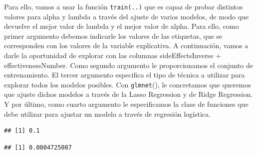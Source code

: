 \documentclass[spanish,]{article}
\newenvironment{Shaded}{\begin{snugshade}}{\end{snugshade}}
\newcommand{\KeywordTok}[1]{\textcolor[rgb]{0.13,0.29,0.53}{\textbf{#1}}}
\newcommand{\DataTypeTok}[1]{\textcolor[rgb]{0.13,0.29,0.53}{#1}}
\newcommand{\StringTok}[1]{\textcolor[rgb]{0.31,0.60,0.02}{#1}}
\newcommand{\CommentTok}[1]{\textcolor[rgb]{0.56,0.35,0.01}{\textit{#1}}}
\newcommand{\OperatorTok}[1]{\textcolor[rgb]{0.81,0.36,0.00}{\textbf{#1}}}
\newcommand{\NormalTok}[1]{#1}
\begin{document}
Para ello, vamos a usar la función \texttt{train(..)} que es capaz de
probar distintos valores para alpha y lambda a través del ajuste de
varios modelos, de modo que devuelve el mejor valor de lambda y el mejor
valor de alpha. Para ello, como primer argumento debemos indicarle los
valores de las etiquetas, que se corresponden con los valores de la
variable explicativa. A continuación, vamos a darle la oportunidad de
explorar con las columnas sideEffectsInverse + effectivenessNumber. Como
segundo argumento le proporcionamos el conjunto de entrenamiento. El
tercer argumento especifica el tipo de técnica a utilizar para explorar
todos los modelos posibles. Con \texttt{glmnet}(), le concretamos que
queremos que ajuste dichos modelos a través de la Lasso Regression y de
Ridge Regression. Y por último, como cuarto argumento le especificamos
la clase de funciones que debe utilizar para ajustar un modelo a través
de regresión logística.

\begin{Shaded}
\end{Shaded}

\begin{verbatim}
## [1] 0.1
\end{verbatim}

\begin{Shaded}
\end{Shaded}

\begin{verbatim}
## [1] 0.0004725087
\end{verbatim}
\end{document}
